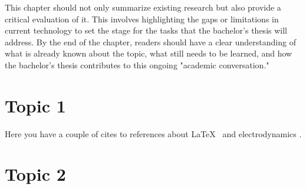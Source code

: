   This chapter should not only summarize existing research but also provide a critical evaluation of it. This involves highlighting the gaps or limitations in current technology to set the stage for the tasks that the bachelor's thesis will address. By the end of the chapter, readers should have a clear understanding of what is already known about the topic, what still needs to be learned, and how the bachelor's thesis contributes to this ongoing "academic conversation."

  \section{Topic 1}

  Here you have a couple of cites to references about \LaTeX~\cite{latexcompanion} and electrodynamics \cite{einstein}.

  \section{Topic 2}
  \lipsum[7]

\fi



